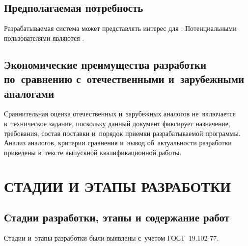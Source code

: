 \documentclass[12pt,a4paper]{extarticle}
\begin{document}
\subsection{Предполагаемая потребность}

Разрабатываемая система может представлять интерес для . Потенциальными пользователями являются .

\subsection{Экономические преимущества разработки по~сравнению с~отечественными и~зарубежными аналогами}

Сравнительная оценка отечественных и~зарубежных аналогов не~включается в~техническое задание, поскольку данный документ фиксирует назначение, требования, состав поставки и~порядок приемки разрабатываемой программы. Анализ аналогов, критерии сравнения и~вывод об~актуальности разработки приведены в~тексте выпускной квалификационной работы.

\clearpage

\section{СТАДИИ И ЭТАПЫ РАЗРАБОТКИ}

\subsection{Стадии разработки, этапы и содержание работ}

Стадии и~этапы разработки были выявлены с~учетом ГОСТ~19.102-77\cite{gost19102}.
\end{document}
